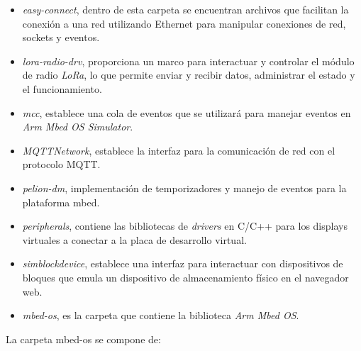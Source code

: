\begin{itemize}
    \item \textit{easy-connect}, dentro de esta carpeta se encuentran archivos que facilitan la conexión a una red utilizando Ethernet para manipular conexiones de red, sockets y eventos.

    \item \textit{lora-radio-drv}, proporciona un marco para interactuar y controlar el módulo de radio \textit{LoRa}, lo que permite enviar y recibir datos, administrar el estado y el funcionamiento.

    \item \textit{mcc}, establece una cola de eventos que se utilizará para manejar eventos en \textit{Arm Mbed OS Simulator}. 

    \item \textit{MQTTNetwork}, establece la interfaz para la comunicación de red con el protocolo MQTT. 

    \item \textit{pelion-dm}, implementación de temporizadores y manejo de eventos para la plataforma mbed.

    \item \textit{peripherals}, contiene las bibliotecas de \textit{drivers} en C/C++ para los displays virtuales a conectar a la placa de desarrollo virtual.

    \item \textit{simblockdevice}, establece una interfaz para interactuar con  dispositivos de bloques que emula un dispositivo de almacenamiento físico en el navegador web.

    \item \textit{mbed-os}, es la carpeta que contiene la biblioteca \textit{Arm Mbed OS}.
	
\end{itemize}

La carpeta \textquotedbl mbed-os\textquotedbl{} se compone de: 

